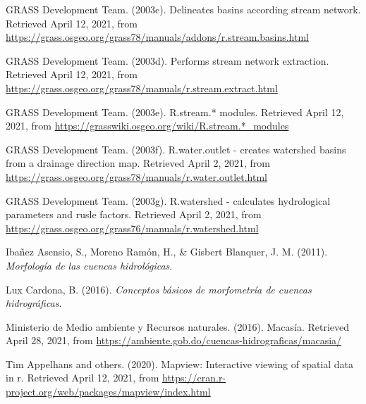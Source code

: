 \documentclass[11pt,]{article}
\begin{document}
\hypertarget{ref-addonrstreambasins}{}
GRASS Development Team. (2003c). Delineates basins according stream
network. Retrieved April 12, 2021, from
\url{https://grass.osgeo.org/grass78/manuals/addons/r.stream.basins.html}

\hypertarget{ref-addonrstreamextract}{}
GRASS Development Team. (2003d). Performs stream network extraction.
Retrieved April 12, 2021, from
\url{https://grass.osgeo.org/grass78/manuals/r.stream.extract.html}

\hypertarget{ref-addonrstream}{}
GRASS Development Team. (2003e). R.stream.* modules. Retrieved April 12,
2021, from \url{https://grasswiki.osgeo.org/wiki/R.stream.*_modules}

\hypertarget{ref-addonrwateroutlet}{}
GRASS Development Team. (2003f). R.water.outlet - creates watershed
basins from a drainage direction map. Retrieved April 2, 2021, from
\url{https://grass.osgeo.org/grass78/manuals/r.water.outlet.html}

\hypertarget{ref-addonrwater}{}
GRASS Development Team. (2003g). R.watershed - calculates hydrological
parameters and rusle factors. Retrieved April 2, 2021, from
\url{https://grass.osgeo.org/grass76/manuals/r.watershed.html}

\hypertarget{ref-ibanez2011morfologia}{}
Ibañez Asensio, S., Moreno Ramón, H., \& Gisbert Blanquer, J. M. (2011).
\emph{Morfología de las cuencas hidrológicas}.

\hypertarget{ref-lux2016conceptos}{}
Lux Cardona, B. (2016). \emph{Conceptos básicos de morfometría de
cuencas hidrográficas}.

\hypertarget{ref-MedioAmbiente}{}
Ministerio de Medio ambiente y Recursos naturales. (2016). Macasía.
Retrieved April 28, 2021, from
\url{https://ambiente.gob.do/cuencas-hidrograficas/macasia/}

\hypertarget{ref-mapview}{}
Tim Appelhans and others. (2020). Mapview: Interactive viewing of
spatial data in r. Retrieved April 12, 2021, from
\url{https://cran.r-project.org/web/packages/mapview/index.html}




\newpage
\singlespacing 
\end{document}
